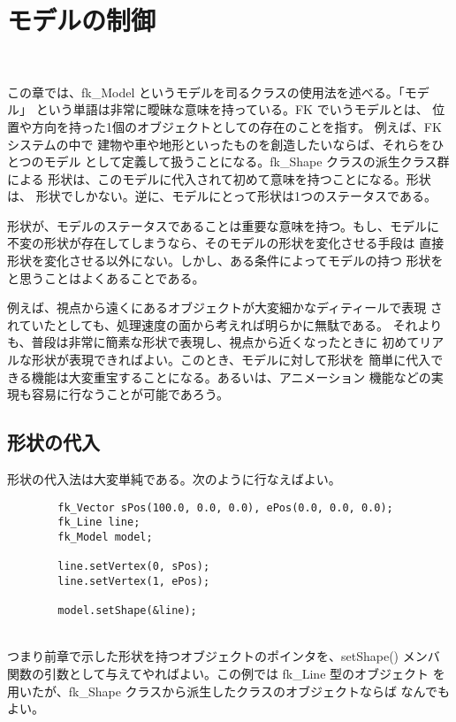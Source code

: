 \chapter{モデルの制御} \label{sec:model} ~

この章では、fk\_Model というモデルを司るクラスの使用法を述べる。「モデル」
という単語は非常に曖昧な意味を持っている。FK でいうモデルとは、
位置や方向を持った1個のオブジェクトとしての存在のことを指す。
例えば、FK システムの中で
建物や車や地形といったものを創造したいならば、それらをひとつのモデル
として定義して扱うことになる。fk\_Shape クラスの派生クラス群による
形状は、このモデルに代入されて初めて意味を持つことになる。形状は、
形状でしかない。逆に、モデルにとって形状は1つのステータスである。

形状が、モデルのステータスであることは重要な意味を持つ。もし、モデルに
不変の形状が存在してしまうなら、そのモデルの形状を変化させる手段は
直接形状を変化させる以外にない。しかし、ある条件によってモデルの持つ
形状をと思うことはよくあることである。

例えば、視点から遠くにあるオブジェクトが大変細かなディティールで表現
されていたとしても、処理速度の面から考えれば明らかに無駄である。
それよりも、普段は非常に簡素な形状で表現し、視点から近くなったときに
初めてリアルな形状が表現できればよい。このとき、モデルに対して形状を
簡単に代入できる機能は大変重宝することになる。あるいは、アニメーション
機能などの実現も容易に行なうことが可能であろう。
\section{形状の代入}
形状の代入法は大変単純である。次のように行なえばよい。
\\
\begin{breakbox}
\begin{verbatim}
        fk_Vector sPos(100.0, 0.0, 0.0), ePos(0.0, 0.0, 0.0);
        fk_Line line;
        fk_Model model;

        line.setVertex(0, sPos);
        line.setVertex(1, ePos);

        model.setShape(&line);
\end{verbatim}
\end{breakbox}
~ \\
つまり前章で示した形状を持つオブジェクトのポインタを、setShape() メンバ
関数の引数として与えてやればよい。この例では fk\_Line 型のオブジェクト
を用いたが、fk\_Shape クラスから派生したクラスのオブジェクトならば
なんでもよい。

